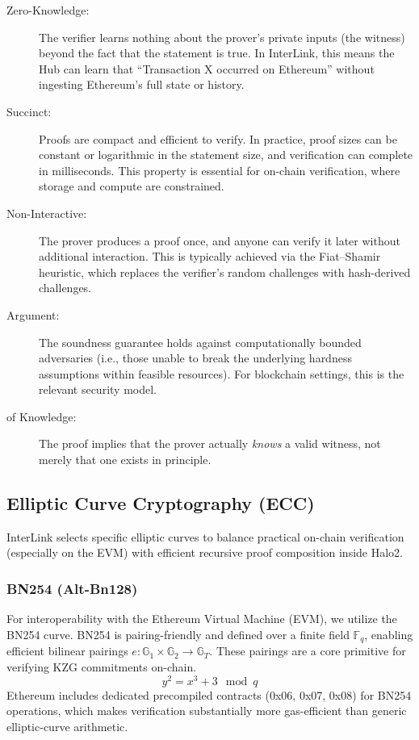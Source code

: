 \documentclass[11pt,a4paper]{article}
\begin{document}
\begin{description}
    \item[Zero-Knowledge:] The verifier learns nothing about the prover's private inputs (the witness) beyond the fact that the statement is true. In InterLink, this means the Hub can learn that ``Transaction X occurred on Ethereum'' without ingesting Ethereum's full state or history.
    
    \item[Succinct:] Proofs are compact and efficient to verify. In practice, proof sizes can be constant or logarithmic in the statement size, and verification can complete in milliseconds. This property is essential for on-chain verification, where storage and compute are constrained.
    
    \item[Non-Interactive:] The prover produces a proof once, and anyone can verify it later without additional interaction. This is typically achieved via the Fiat--Shamir heuristic, which replaces the verifier's random challenges with hash-derived challenges.
    
    \item[Argument:] The soundness guarantee holds against computationally bounded adversaries (i.e., those unable to break the underlying hardness assumptions within feasible resources). For blockchain settings, this is the relevant security model.
    
    \item[of Knowledge:] The proof implies that the prover actually \emph{knows} a valid witness, not merely that one exists in principle.
\end{description}

\subsection{Elliptic Curve Cryptography (ECC)}
InterLink selects specific elliptic curves to balance practical on-chain verification (especially on the EVM) with efficient recursive proof composition inside Halo2.

\subsubsection{BN254 (Alt-Bn128)}
For interoperability with the Ethereum Virtual Machine (EVM), we utilize the BN254 curve. BN254 is pairing-friendly and defined over a finite field $\mathbb{F}_q$, enabling efficient bilinear pairings $e: \mathbb{G}_1 \times \mathbb{G}_2 \rightarrow \mathbb{G}_T$. These pairings are a core primitive for verifying KZG commitments on-chain.
$$ y^2 = x^3 + 3 \mod q $$
Ethereum includes dedicated precompiled contracts (0x06, 0x07, 0x08) for BN254 operations, which makes verification substantially more gas-efficient than generic elliptic-curve arithmetic.
\end{document}
